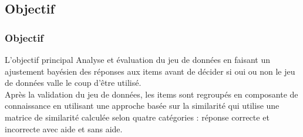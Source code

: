 \documentclass[aspectratio=169,professionalfonts, 12pt]{beamer}
\begin{document}
\subsection{Objectif}

\begin{frame}
  \frametitle{Objectif}
  \begin{block}{L'objectif principal}
    Analyse et évaluation du jeu de données en faisant un ajustement bayésien des réponses aux items avant de décider si oui ou non le jeu de données valle le coup d’être utilisé.\\
    Après la validation du jeu de données, les items sont regroupés en composante de connaissance en utilisant une approche basée sur la similarité qui utilise une matrice de similarité calculée selon quatre catégories : réponse correcte et incorrecte avec aide et sans aide.
  \end{block}     
\end{frame}
\end{document}

